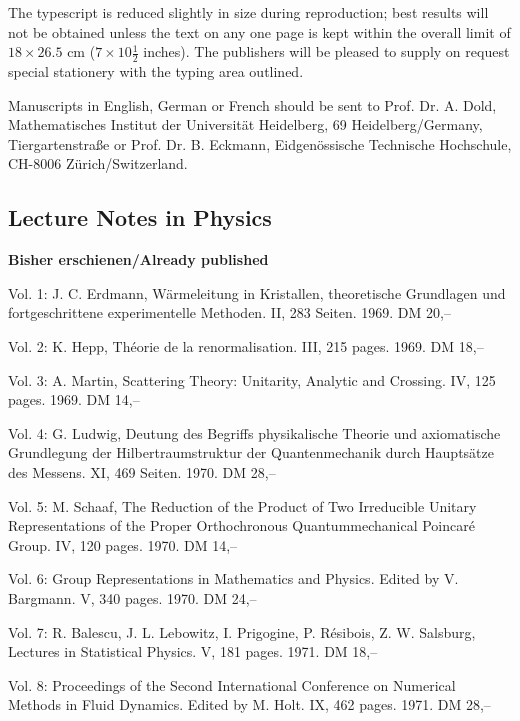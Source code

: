 The typescript is reduced slightly in size during reproduction; best results
will not be obtained unless the text on any one page is kept within the overall
limit of $18\times26.5$ cm ($7\times10\frac12$ inches). The publishers will be
pleased to supply on request special stationery with the typing area outlined.

Manuscripts in English, German or French should be sent to Prof. Dr. A. Dold,
Mathematisches Institut der Universität Heidelberg, 69 Heidelberg/Germany,
Tiergartenstraße or Prof. Dr. B. Eckmann, Eidgenössische Technische Hochschule,
CH-8006 Zürich/Switzerland.

\subsection*{Lecture Notes in Physics}
\textbf{Bisher erschienen/Already published}

Vol. 1: J. C. Erdmann, Wärmeleitung in Kristallen, theoretische Grundlagen und
fortgeschrittene experimentelle Methoden. II, 283 Seiten. 1969. DM 20,--

Vol. 2: K. Hepp, Théorie de la renormalisation. III, 215 pages. 1969. DM 18,--

Vol. 3: A. Martin, Scattering Theory: Unitarity, Analytic and Crossing.
IV, 125 pages. 1969. DM 14,--

Vol. 4: G. Ludwig, Deutung des Begriffs physikalische Theorie und axiomatische
Grundlegung der Hilbertraumstruktur der Quantenmechanik durch Hauptsätze des
Messens. XI, 469 Seiten. 1970. DM 28,--

Vol. 5: M. Schaaf, The Reduction of the Product of Two Irreducible Unitary
Representations of the Proper Orthochronous Quantummechanical Poincaré Group.
IV, 120 pages. 1970. DM 14,--

Vol. 6: Group Representations in Mathematics and Physics. Edited by V. Bargmann.
V, 340 pages. 1970. DM 24,--

Vol. 7: R. Balescu, J. L. Lebowitz, I. Prigogine, P. Résibois, Z. W. Salsburg,
Lectures in Statistical Physics. V, 181 pages. 1971. DM 18,--

Vol. 8: Proceedings of the Second International Conference on Numerical Methods
in Fluid Dynamics. Edited by M. Holt. IX, 462 pages. 1971. DM 28,--

